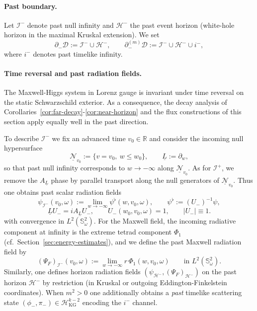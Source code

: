 \documentclass[11pt]{article}
\numberwithin{equation}{section}
\theoremstyle{plain}
\theoremstyle{definition}
\theoremstyle{remark}
\newcommand{\D}{\mathcal{D}}
\begin{document}
\paragraph{Past boundary.}
Let $\mathcal I^{-}$ denote past null infinity and $\mathcal H^{-}$ the past event horizon (white-hole horizon in the maximal Kruskal extension).
We set
\begin{equation}
\partial_{-}\D:=\mathcal I^{-}\cup\mathcal H^{-},
\qquad
\partial_{-}^{(m)}\D:=\mathcal I^{-}\cup\mathcal H^{-}\cup i^{-},
\end{equation}
where $i^{-}$ denotes past timelike infinity.

\paragraph{Time reversal and past radiation fields.}
The Maxwell-Higgs system in Lorenz gauge is invariant under time reversal on the static Schwarzschild exterior.
As a consequence, the decay analysis of Corollaries~\ref{cor:far-decay}-\ref{cor:near-horizon} and the flux constructions of this section apply equally well in the past direction.

To describe $\mathcal I^{-}$ we fix an advanced time $v_0\in\mathbb R$ and consider the incoming null hypersurface
\begin{equation}
\underline{\mathcal N}_{v_0}:=\{v=v_0,\ w\le w_0\},
\qquad \underline L:=\partial_w,
\end{equation}
so that past null infinity corresponds to $w\to-\infty$ along $\underline{\mathcal N}_{v_0}$.
As for $\mathcal I^{+}$, we remove the $A_{\underline L}$ phase by parallel transport along the null generators of $\underline{\mathcal N}_{v_0}$.
Thus one obtains past scalar radiation fields
\begin{equation}
\psi_{\mathcal I^-}(v_0,\omega):=\lim_{w\to-\infty}\psi^{\flat}(w,v_0,\omega),
\qquad \psi^{\flat}:=(U_{-})^{-1}\psi,
\end{equation}
\begin{equation}
\underline L U_{-}= iA_{\underline L}U_{-},\qquad U_{-}(w_0,v_0,\omega)=1,\qquad |U_{-}|\equiv 1.
\end{equation}
with convergence in $L^2(\mathbb S^{2}_\omega)$.
For the Maxwell field, the incoming radiative component at infinity is the extreme tetrad component $\Phi_{1}$ (cf.~Section~\ref{sec:energy-estimates}), and we define the past Maxwell radiation field by
\begin{equation}
(\Psi_F)_{\mathcal I^-}(v_0,\omega):=\lim_{w\to-\infty} r\,\Phi_{1}(w,v_0,\omega)
\qquad \text{in }L^2(\mathbb S^{2}_\omega).
\end{equation}
Similarly, one defines horizon radiation fields $(\psi_{\mathcal H^-},(\Psi_F)_{\mathcal H^-})$ on the past horizon $\mathcal H^{-}$ by restriction (in Kruskal or outgoing Eddington-Finkelstein coordinates).
When $m^{2}>0$ one additionally obtains a \emph{past} timelike scattering state $(\phi_{-},\pi_{-})\in\mathcal H_{\mathrm{KG}}^{k-2}$ encoding the $i^{-}$ channel.
\end{document}
